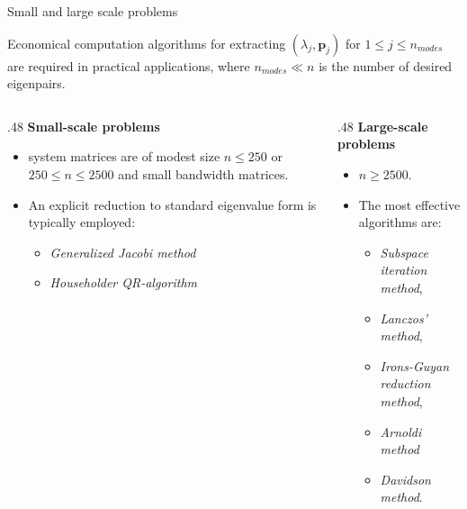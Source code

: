 \documentclass[aspectratio=169]{beamer}
\begin{document}
\begin{frame}{Small and large scale problems}
  \vspace{-0.3cm}
  \begin{tcolorbox}[colback=darkred!10,colframe=darkred!40!black]
    Economical computation algorithms for extracting $(\lambda_j,\mathbf p_j)$ for $1\leq j \leq n_{modes}$ are required in practical applications, where $n_{modes}\ll n$ is the number of desired eigenpairs.
  \end{tcolorbox}

  \begin{columns}[T]
    \begin{column}{.48\textwidth}
      \textbf{Small-scale problems}
      \begin{itemize}
        \item system matrices are of modest size $n\leq 250$ or $250\leq n \leq 2500$ and small bandwidth matrices.
        \item An explicit reduction to standard eigenvalue form is typically employed:
              \begin{itemize}
                \item\emph{Generalized Jacobi method}
                \item \emph{Householder QR-algorithm}
              \end{itemize}
      \end{itemize}
    \end{column}
    \begin{column}{.48\textwidth}
      \textbf{Large-scale problems}
      \begin{itemize}
        \item $n\geq 2500$.
        \item The most effective algorithms are:
              \begin{itemize}
                \item \emph{Subspace iteration method},
                \item \emph{Lanczos' method},
                \item \emph{Irons-Guyan reduction method},
                \item \emph{Arnoldi method}
                \item \emph{Davidson method}.
              \end{itemize}
      \end{itemize}
    \end{column}
  \end{columns}
\end{frame}
\end{document}
